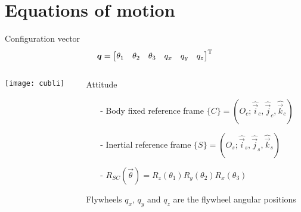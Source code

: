 \section{Equations of motion}
\begin{frame}{Configuration vector}
  \[  
  \boldsymbol{q} =
  \begin{bmatrix}
    \theta_{1} & \theta_{2} & \theta_{3} & q_{x} & q_{y} & q_{z}
  \end{bmatrix} ^{\mathrm{T}}
  \]
  \vskip-0.1in
  \begin{columns}
    \begin{column}{0.55\textwidth}
      \texttt{[image: cubli]}
    \end{column}
    \begin{column}{0.6\textwidth}
      \begin{block}{Attitude}
        \begin{itemize}
        \item[-] Body fixed reference frame $\{C\} = (O_c; \hat{\vec{i}}_c, \hat{\vec{j}}_c, \hat{\vec{k}}_c)$
        \item[-] Inertial reference frame $\{S\} = (O_s; \hat{\vec{i}}_s, \hat{\vec{j}}_s, \hat{\vec{k}}_s)$
        \item[-] $R_{SC}(\vec{\theta}) = R_z(\theta_1)R_y(\theta_2)R_x(\theta_3)$
        \end{itemize}
      \end{block}
      \begin{block}{Flywheels}
        $q_x$, $q_y$ and $q_z$ are the flywheel angular positions
      \end{block}
    \end{column}
  \end{columns}
\end{frame}

